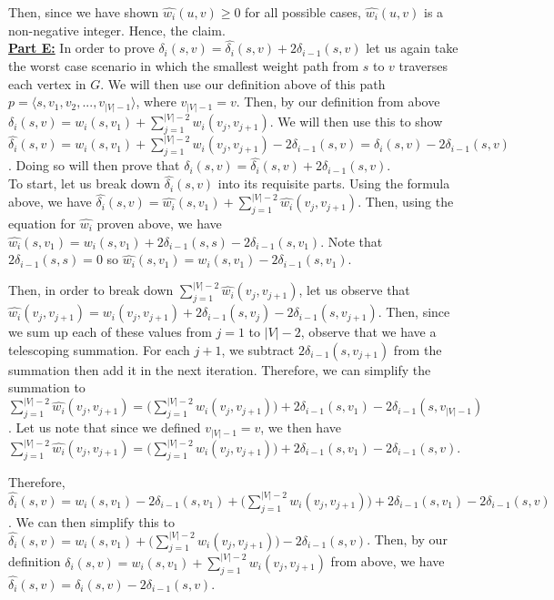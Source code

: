 \documentclass[11pt]{article}
\begin{document}
Then, since we have shown $\hat{w_i}(u,v) \geq 0$ for all possible cases, $\hat{w_i}(u,v)$ is a non-negative integer. Hence, the claim.\\

\underline{\textbf{Part E:}} In order to prove $\delta_i(s,v) = \hat{\delta_i}(s,v) + 2\delta_{i-1}(s,v)$ let us again take the worst case scenario in which the smallest weight path from $s$ to $v$ traverses each vertex in $G$. We will then use our definition above of this path $p = \langle s, v_1, v_2, ..., v_{|V| - 1} \rangle$, where $v_{|V|-1} = v$. Then, by our definition from above $\delta_i(s,v) = w_i(s,v_1) + \sum\limits_{j=1}^{|V| - 2}{w_i(v_j, v_{j+1})}$. We will then use this to show $\hat{\delta_i}(s,v) = w_i(s,v_1) + \sum\limits_{j=1}^{|V| - 2}{w_i(v_j, v_{j+1})} - 2\delta_{i-1}(s,v) = \delta_i(s,v) - 2\delta_{i-1}(s,v)$. Doing so will then prove that $\delta_i(s,v) = \hat{\delta_i}(s,v) + 2\delta_{i-1}(s,v)$.\\

To start, let us break down $\hat{\delta_i}(s,v)$ into its requisite parts. Using the formula above, we have $\hat{\delta_i}(s,v) = \hat{w_i}(s,v_1) + \sum\limits_{j=1}^{|V| - 2}{\hat{w_i}(v_j, v_{j+1})}$. Then, using the equation for $\hat{w_i}$ proven above, we have $\hat{w_i}(s,v_1) = w_i(s,v_1) + 2\delta_{i-1}(s,s) - 2\delta_{i-1}(s,v_1)$. Note that $2\delta_{i-1}(s,s) = 0$ so $\hat{w_i}(s,v_1) = w_i(s,v_1) - 2\delta_{i-1}(s,v_1)$.

Then, in order to break down $\sum\limits_{j=1}^{|V| - 2}{\hat{w_i}(v_j, v_{j+1})}$, let us observe that $\hat{w_i}(v_j, v_{j+1}) = w_i(v_j,v_{j+1}) + 2\delta_{i-1}(s,v_j) - 2\delta_{i-1}(s,v_{j+1})$. Then, since we sum up each of these values from $j=1$ to $|V|-2$, observe that we have a telescoping summation. For each $j+1$, we subtract $2\delta_{i-1}(s,v_{j+1})$ from the summation then add it in the next iteration. Therefore, we can simplify the summation to $\sum\limits_{j=1}^{|V| - 2}{\hat{w_i}(v_j, v_{j+1})} = \Big( \sum\limits_{j=1}^{|V| - 2}{w_i(v_j,v_{j+1})}\Big) + 2\delta_{i-1}(s,v_1) - 2\delta_{i-1}(s,v_{|V|-1})$. Let us note that since we defined $v_{|V|-1} = v$, we then have $\sum\limits_{j=1}^{|V| - 2}{\hat{w_i}(v_j, v_{j+1})} = \Big( \sum\limits_{j=1}^{|V| - 2}{w_i(v_j,v_{j+1})}\Big) + 2\delta_{i-1}(s,v_1) - 2\delta_{i-1}(s,v)$.

Therefore, $\hat{\delta_i}(s,v) = w_i(s,v_1) - 2\delta_{i-1}(s,v_1) + \Big( \sum\limits_{j=1}^{|V| - 2}{w_i(v_j,v_{j+1})}\Big) + 2\delta_{i-1}(s,v_1) - 2\delta_{i-1}(s,v)$. We can then simplify this to $\hat{\delta_i}(s,v) = w_i(s,v_1) + \Big( \sum\limits_{j=1}^{|V| - 2}{w_i(v_j,v_{j+1})}\Big) - 2\delta_{i-1}(s,v)$. Then, by our definition $\delta_i(s,v) = w_i(s,v_1) + \sum\limits_{j=1}^{|V| - 2}{w_i(v_j, v_{j+1})}$ from above, we have $\hat{\delta_i}(s,v) = \delta_i(s,v) - 2\delta_{i-1}(s,v)$.
\end{document}
